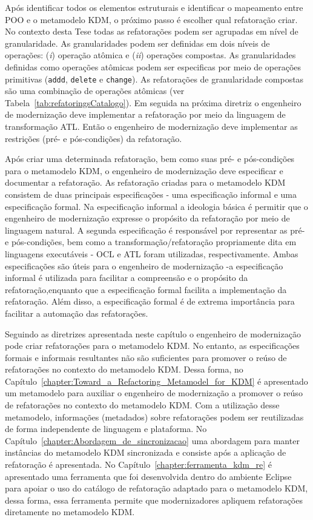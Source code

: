 Após identificar todos os elementos estruturais e identificar o mapeamento entre POO e o metamodelo KDM, o próximo passo é escolher qual refatoração criar. No contexto desta Tese todas as refatorações podem ser agrupadas em nível de granularidade. As granularidades podem ser definidas em dois níveis de operações: (\textit{i}) operação atômica e (\textit{ii}) operações compostas. As granularidades definidas como operações atômicas podem ser especificas por meio de operações primitivas (\texttt{addd}, \texttt{delete} e \texttt{change}). As refatorações de granularidade compostas são uma combinação de operações atômicas (ver Tabela~\ref{tab:refatoringsCatalogo}). Em seguida na próxima diretriz o engenheiro de modernização deve implementar a refatoração por meio da linguagem de transformação ATL. Então o engenheiro de modernização deve implementar as restrições (pré- e pós-condições) da refatoração.

Após criar uma determinada refatoração, bem como suas pré- e pós-condições para o metamodelo KDM, o engenheiro de modernização deve especificar e documentar a refatoração. As refatoração criadas para o metamodelo KDM consistem de duas principais especificações - uma especificação informal e uma especificação formal. Na especificação informal a ideologia básica é permitir que o engenheiro de modernização expresse o propósito da refatoração por meio de linguagem natural. A segunda especificação é responsável por representar as pré- e pós-condições, bem como a transformação/refatoração propriamente dita em linguagens executáveis - OCL e ATL foram utilizadas, respectivamente. Ambas especificações são úteis para o engenheiro de modernização -a especificação informal é utilizada para facilitar a compreensão e o propósito da refatoração,enquanto que a especificação formal facilita a implementação da refatoração. Além disso, a especificação formal é de extrema importância para facilitar a automação das refatorações. %

Seguindo as diretrizes apresentada neste capítulo o engenheiro de modernização pode criar refatorações para o metamodelo KDM. No entanto, as especificações formais e informais resultantes não são suficientes para promover o reúso de refatorações no contexto do metamodelo KDM. Dessa forma, no Capítulo~\ref{chapter:Toward_a_Refactoring_Metamodel_for_KDM} é apresentado um metamodelo para auxiliar o engenheiro de modernização a promover o reúso de refatorações no contexto do metamodelo KDM. Com a utilização desse metamodelo, informações (metadados) sobre refatorações podem ser reutilizadas de forma independente de linguagem e plataforma. No Capítulo~\ref{chapter:Abordagem_de_sincronizacao} uma abordagem para manter instâncias do metamodelo KDM sincronizada e consiste após a aplicação de refatoração é apresentada. No Capítulo~\ref{chapter:ferramenta_kdm_re} é apresentado uma ferramenta que foi desenvolvida dentro do ambiente Eclipse para apoiar o uso do catálogo de refatoração adaptado para o metamodelo KDM, dessa forma, essa ferramenta permite que modernizadores apliquem refatorações diretamente no metamodelo KDM. 
